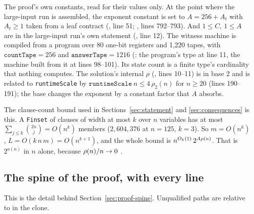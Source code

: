 The proof's own constants, read for their values only. At the point where
the large-input run is assembled, the exponent constant is set to
\(A = 256 + A_t\) with \(A_t \ge 1\) taken from a leaf contract
(, line 51;
, lines 792--793). And
\(1 \le C\), \(1 \le A\) are in the large-input run's own statement
(, line 12). The witness
machine is compiled from a program over 80 one-bit registers and 1,220
tapes, with \(\mathtt{countTape} = 256\) and \(\mathtt{answerTape} = 1216\)
(: the program's type at line 11, the
machine built from it at lines 98--101). Its state count is
a finite type's cardinality that nothing computes. The solution's
internal \(\rho\) (, lines
10--11) is in base 2 and is related to \texttt{runtimeScale} by
\(\mathtt{runtimeScale}\ n \le 4\,\rho_2(n)\) for \(n \ge 20\)
(lines 190--191); the base changes the exponent by a constant factor
that \(A\) absorbs.

The clause-count bound used in Sections~\ref{sec:statement} and
\ref{sec:consequences} is this. A \texttt{Finset} of clauses of width at most
\(k\) over \(n\) variables has at most \(\sum_{j \le k}\binom{2n}{j} =
O(n^k)\) members (\(2{,}604{,}376\) at \(n = 125\), \(k = 3\)). So
\(m = O(n^k)\), \(L = O(k\,n\,m) = O(n^{k+1})\), and the whole bound is
\(n^{O_k(1)}\,2^{A\rho(n)}\). That is \(2^{o(n)}\) in \(n\) alone, because
\(\rho(n)/n \to 0\) .

\subsection{The spine of the proof, with every line}
\label{app:tech-spine}

This is the detail behind Section~\ref{sec:proof-spine}. Unqualified
paths are relative to  in
the clone.

